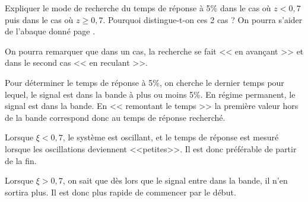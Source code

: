 

\fi


\begin{question}Expliquer le mode de recherche du temps de réponse à 5\% dans le cas où $z<0,7$ puis dans le cas où $z\geq 0,7$. Pourquoi distingue-t-on ces 2 cas ? On pourra s'aider de l'abaque donné page \pageref{ref_aba}.
\end{question}

\ifprof
\else
\begin{rem}
On pourra remarquer que dans un cas, la recherche se fait << en avançant >> et dans le second cas << en reculant >>. 
\end{rem}




\fi

\ifprof
\begin{corrige}
Pour déterminer le temps de réponse à 5\%, on cherche le dernier temps pour lequel, le signal est dans la bande à plus ou moins 5\%. En régime permanent, le signal est dans la bande. En << remontant le temps >> la première valeur hors de la bande correspond donc au temps de réponse recherché. 

Lorsque $\xi<0,7$, le système est oscillant, et le temps de réponse est mesuré lorsque les oscillations deviennent <<petites>>. Il est donc préférable de partir de la fin.

Lorsque $\xi>0,7$, on sait que dès lors que le signal entre dans la bande, il n'en sortira plus. Il est donc plus rapide de commencer par le début. 

\end{corrige}
\else
\fi


